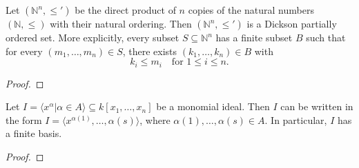 \begin{theorem}\label{thm:Dickson} %
    \leanok %
    Let $(\mathbb{N}^n, \le')$ be the direct product of $n$ copies of the natural numbers $(\mathbb{N}, \le)$ with their natural ordering. 
    Then $(\mathbb{N}^n, \le')$ is a Dickson partially ordered set. 
    More explicitly, every subset $S \subseteq \mathbb{N}^n$ has a finite subset $B$ such that for every $(m_1, \dots, m_n) \in S$, there exists $(k_1, \dots, k_n) \in B$ with
    \[
    k_i \le m_i \quad \text{for } 1 \le i \le n.
    \]
\end{theorem}
\begin{proof}
  \leanok %
\end{proof}

\begin{theorem}
    \label{thm:Dickson_MvPolynomial}
    \leanok %
    Let $I = \langle x^{\alpha} | \alpha \in A \rangle \subseteq k[x_1, \ldots, x_n]$ be a monomial ideal.
    Then $I$ can be written in the form $I = \langle x^{\alpha(1)}, \ldots , {\alpha(s)} \rangle$, where
    $\alpha(1), \ldots, \alpha(s) \in A$.
    In particular, $I$ has a finite basis.
\end{theorem}
\begin{proof}
  \leanok %
\end{proof}